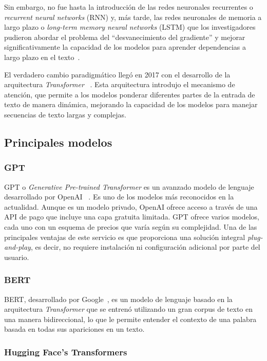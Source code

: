 Sin embargo, no fue hasta la introducción de las redes neuronales recurrentes o \textit{recurrent neural networks} (RNN)
y, más tarde, las redes neuronales de memoria a largo plazo o \textit{long-term memory neural networks} (LSTM) que
los investigadores pudieron abordar el problema del ``desvanecimiento del gradiente'' y mejorar significativamente la
capacidad de los modelos para aprender dependencias a largo plazo en el texto~\cite{article_hochreiter_1997}.

El verdadero cambio paradigmático llegó en 2017 con el desarrollo de la arquitectura \textit{Transformer}
~\cite{article_vaswani_2017}.
Esta arquitectura introdujo el mecanismo de atención, que permite a los modelos ponderar diferentes partes de la entrada
de texto de manera dinámica, mejorando la capacidad de los modelos para manejar secuencias de texto largas y complejas.

\subsection*{Principales modelos}

\subsubsection*{GPT}
GPT o \textit{Generative Pre-trained Transformer} es un avanzado modelo de lenguaje desarrollado por OpenAI
~\cite{article_brown_2020}.
Es uno de los modelos más reconocidos en la actualidad.
Aunque es un modelo privado, OpenAI ofrece acceso a través de una API de pago que incluye una capa gratuita limitada.
GPT ofrece varios modelos, cada uno con un esquema de precios que varía según su complejidad.
Una de las principales ventajas de este servicio es que proporciona una solución integral \textit{plug-and-play}, es
decir, no requiere instalación ni configuración adicional por parte del usuario.

\subsubsection*{BERT}
BERT, desarrollado por Google~\cite{article_devlin_2019}, es un modelo de lenguaje basado en la arquitectura
\textit{Transformer} que se entrenó utilizando un gran corpus de texto en una manera bidireccional, lo que le permite
entender el contexto de una palabra basada en todas sus apariciones en un texto.

\subsubsection*{Hugging Face's Transformers}

